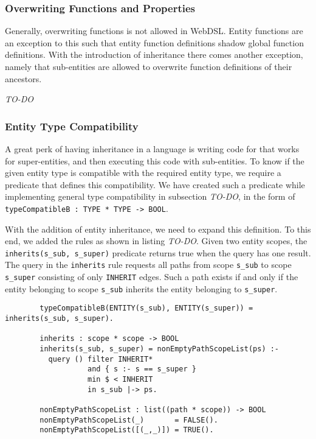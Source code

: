     \subsubsection{Overwriting Functions and Properties}
      Generally, overwriting functions is not allowed in WebDSL. Entity functions are an exception to this such that entity function definitions shadow global function definitions. With the introduction of inheritance there comes another exception, namely that sub-entities are allowed to overwrite function definitions of their ancestors.

      \emph{TO-DO}

    \subsubsection{Entity Type Compatibility}
      A great perk of having inheritance in a language is writing code for that works for super-entities, and then executing this code with sub-entities. To know if the given entity type is compatible with the required entity type, we require a predicate that defines this compatibility. We have created such a predicate while implementing general type compatibility in subsection \emph{TO-DO}, in the form of \lstinline|typeCompatibleB : TYPE * TYPE -> BOOL|.

      With the addition of entity inheritance, we need to expand this definition. To this end, we added the rules as shown in listing \emph{TO-DO}. Given two entity scopes, the \lstinline|inherits(s_sub, s_super)| predicate returns true when the query has one result. The query in the \texttt{inherits} rule requests all paths from scope \texttt{s\_sub} to scope \texttt{s\_super} consisting of only \texttt{INHERIT} edges. Such a path exists if and only if the entity belonging to scope \texttt{s\_sub} inherits the entity belonging to \texttt{s\_super}.

      \begin{lstlisting}
        typeCompatibleB(ENTITY(s_sub), ENTITY(s_super)) = inherits(s_sub, s_super).

        inherits : scope * scope -> BOOL
        inherits(s_sub, s_super) = nonEmptyPathScopeList(ps) :-
          query () filter INHERIT*
                   and { s :- s == s_super }
                   min $ < INHERIT
                   in s_sub |-> ps.

        nonEmptyPathScopeList : list((path * scope)) -> BOOL
        nonEmptyPathScopeList(_)       = FALSE().
        nonEmptyPathScopeList([(_,_)]) = TRUE().
      \end{lstlisting}

